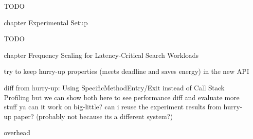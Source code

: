 
TODO

chapter Experimental Setup

TODO

chapter Frequency Scaling for Latency-Critical Search Workloads

try to keep hurry-up properties (meets deadline and saves energy) in the new API

diff from hurry-up:
Using SpecificMethodEntry/Exit instead of Call Stack Profiling
but we can show both here to see performance diff and evaluate more stuff ya
can it work on big-little?
can i reuse the experiment results from hurry-up paper? (probably not because its a different system?)

overhead


